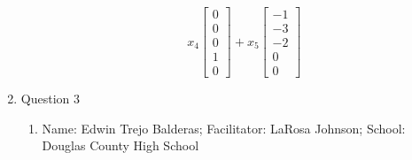 \documentclass{article}
\begin{document}
\begin{enumerate}
\begin{enumerate}
\[        x_4 \begin{bmatrix} 0 \\ 0 \\ 0 \\ 1 \\ 0 \end{bmatrix} + 
        x_5 \begin{bmatrix} -1 \\ -3\\ -2 \\ 0 \\ 0 \end{bmatrix}
        \]
    \end{enumerate}

    \newpage 
    \item Question 3
    \begin{enumerate}
        \item Name: Edwin Trejo Balderas; Facilitator: LaRosa Johnson; School: Douglas County High School
    \end{enumerate}

\end{enumerate}
\end{document}
